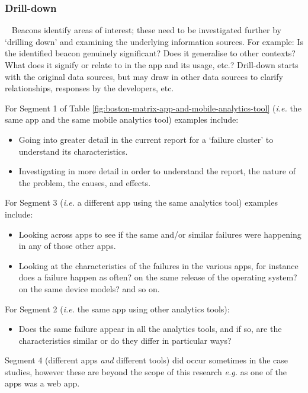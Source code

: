 \subsubsection{Drill-down}~\label{drill-down-research-method}
Beacons identify areas of interest; these need to be investigated further by `drilling down' and examining the underlying information sources. For example:  Is the identified beacon genuinely significant? Does it generalise to other contexts?  What does it signify or relate to in the app and its usage, etc.?  Drill-down starts with the original data sources, but may draw in other data sources to clarify relationships, responses by the developers, etc. 

For Segment 1 of Table \ref{fig:boston-matrix-app-and-mobile-analytics-tool} (\emph{i.e.} the same app and the same mobile analytics tool) examples include:

\begin{itemize}
    \itemsep0em
    \item Going into greater detail in the current report for a `failure cluster' to understand its characteristics.
    \item  Investigating in more detail in order to understand the report, the nature of the problem, the causes, and effects. 
\end{itemize}

For Segment 3 (\emph{i.e.} a different app using the same analytics tool) examples include: 

\begin{itemize}
    \item Looking across apps to see if the same and/or similar failures were happening in any of those other apps.
    \item Looking at the characteristics of the failures in the various apps, for instance does a failure happen as often? on the same release of the operating system? on the same device models? and so on.
\end{itemize}

For Segment 2 (\emph{i.e.} the same app using other analytics tools):

\begin{itemize}
    \item Does the same failure appear in all the analytics tools, and if so, are the characteristics similar or do they differ in particular ways?
\end{itemize}

Segment 4 (different apps \emph{and} different tools) did occur sometimes in the case studies, however these are beyond the scope of this research \emph{e.g.} as one of the apps was a web app.

